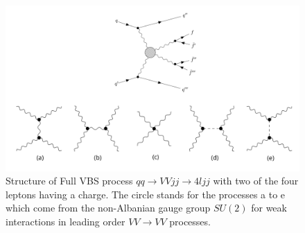 \documentclass[../Bachelorarbeit.tex]{subfiles}
\begin{document}
\label{sec:VBS}

\begin{figure}[h]
    \centering
    \includegraphics[width=\textwidth]{images/feynman_full_VBS.png}
    \caption{Structure of Full VBS process $qq\rightarrow VVjj\rightarrow 4ljj$ with two of the four leptons having a charge. The circle stands for the processes a to e
    which come from the non-Albanian gauge group $SU(2)$ for weak interactions in leading order $VV \rightarrow VV$ processes.\cite{Bittrich.27.05.2020}}
    \label{fig:feynman_full_VBS}
\end{figure}
\end{document}

